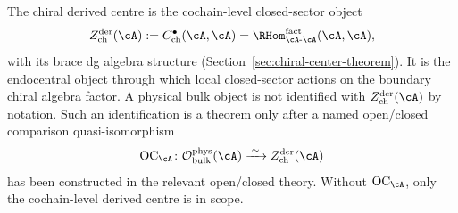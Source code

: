 \begin{remark}
\label{rem:derived-centre-not-physical-bulk-without-comparison}
The chiral derived centre is the cochain-level closed-sector object
\[
 Z^{\mathrm{der}}_{\mathrm{ch}}(\cA)
 := C^\bullet_{\mathrm{ch}}(\cA,\cA)
 = \RHom_{\cA\text{-}\cA}^{\mathrm{fact}}(\cA,\cA),
\]
with its brace dg algebra structure
(Section~\ref{sec:chiral-center-theorem}). It is the endocentral
object through which local closed-sector actions on the boundary
chiral algebra factor. A physical bulk object is not identified with
$Z^{\mathrm{der}}_{\mathrm{ch}}(\cA)$ by notation. Such an
identification is a theorem only after a named open/closed comparison
quasi-isomorphism
\[
 \mathrm{OC}_{\cA}\colon
 \mathcal O^{\mathrm{phys}}_{\mathrm{bulk}}(\cA)
 \xrightarrow{\;\sim\;}
 Z^{\mathrm{der}}_{\mathrm{ch}}(\cA)
\]
has been constructed in the relevant open/closed theory. Without
$\mathrm{OC}_{\cA}$, only the cochain-level derived centre is in
scope.
\end{remark}


